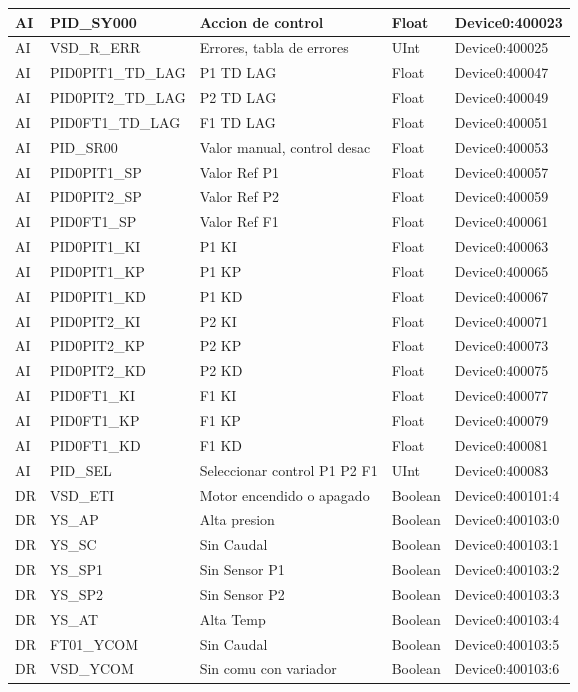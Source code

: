 \begin{longtable}{|p{1.2cm} |p{4cm} |p{4cm} |p{1.5cm} |p{3.2cm} |}
	AI & PID\_SY000 & Accion de control & Float & Device0:400023 \\ \hline
	AI & VSD\_R\_ERR & Errores, tabla de errores & UInt & Device0:400025 \\ \hline
	AI & PID0PIT1\_TD\_LAG & P1 TD LAG & Float & Device0:400047 \\ \hline
	AI & PID0PIT2\_TD\_LAG & P2 TD LAG & Float & Device0:400049 \\ \hline
	AI & PID0FT1\_TD\_LAG & F1 TD LAG & Float & Device0:400051 \\ \hline
	AI & PID\_SR00 & Valor manual, control desac & Float & Device0:400053 \\ \hline
	AI & PID0PIT1\_SP & Valor Ref P1 & Float & Device0:400057 \\ \hline
	AI & PID0PIT2\_SP & Valor Ref P2 & Float & Device0:400059 \\ \hline
	AI & PID0FT1\_SP & Valor Ref F1 & Float & Device0:400061 \\ \hline
	AI & PID0PIT1\_KI & P1 KI & Float & Device0:400063 \\ \hline
	AI & PID0PIT1\_KP & P1 KP & Float & Device0:400065 \\ \hline
	AI & PID0PIT1\_KD & P1 KD & Float & Device0:400067 \\ \hline
	AI & PID0PIT2\_KI & P2 KI & Float & Device0:400071 \\ \hline
	AI & PID0PIT2\_KP & P2 KP & Float & Device0:400073 \\ \hline
	AI & PID0PIT2\_KD & P2 KD & Float & Device0:400075 \\ \hline
	AI & PID0FT1\_KI & F1 KI & Float & Device0:400077 \\ \hline
	AI & PID0FT1\_KP & F1 KP & Float & Device0:400079 \\ \hline
	AI & PID0FT1\_KD & F1 KD & Float & Device0:400081 \\ \hline
	AI & PID\_SEL & Seleccionar control P1 P2 F1 & UInt & Device0:400083 \\ \hline
	DR & VSD\_ETI & Motor encendido o apagado & Boolean & Device0:400101:4 \\ \hline
	DR & YS\_AP & Alta presion & Boolean & Device0:400103:0 \\ \hline
	DR & YS\_SC & Sin Caudal & Boolean & Device0:400103:1 \\ \hline
	DR & YS\_SP1 & Sin Sensor P1 & Boolean & Device0:400103:2 \\ \hline
	DR & YS\_SP2 & Sin Sensor P2 & Boolean & Device0:400103:3 \\ \hline
	DR & YS\_AT & Alta Temp & Boolean & Device0:400103:4 \\ \hline
	DR & FT01\_YCOM & Sin Caudal & Boolean & Device0:400103:5 \\ \hline
	DR & VSD\_YCOM & Sin comu con variador & Boolean & Device0:400103:6 \\ \hline
	
	
\end{longtable}

